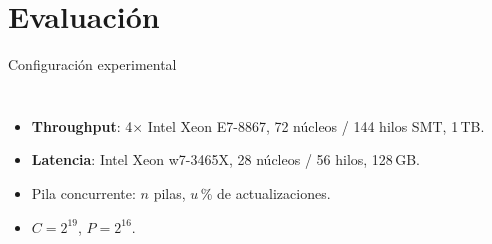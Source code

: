 \documentclass[aspectratio=169,11pt,xcolor=table]{beamer}
\begin{document}
\section{Evaluación}
\begin{frame}{Configuración experimental}
  \begin{columns}[c]
    \begin{itemize}
      \item \textbf{Throughput}: 4$\times$ Intel Xeon E7-8867, 72 núcleos / \alert{144 hilos SMT}, 1\,TB.
      \item \textbf{Latencia}: Intel Xeon w7-3465X, 28 núcleos / \alert{56 hilos}, 128\,GB.
      \item Pila concurrente: $n$ pilas, $u$\,\% de actualizaciones.
      \item $C = 2^{19}$, $P = 2^{16}$.
    \end{itemize}
  \end{columns}
\end{frame}
\end{document}
